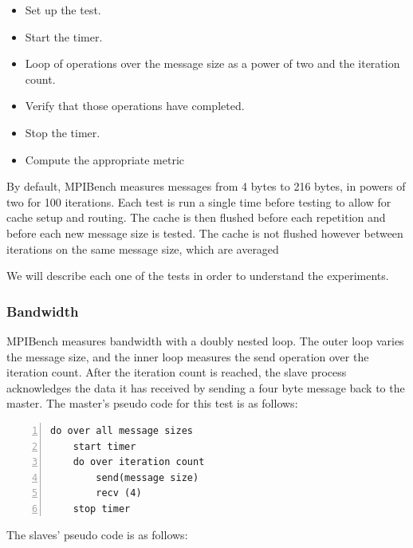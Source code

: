 \begin{itemize}
    \item Set up the test.
    \item Start the timer.
    \item Loop of operations over the message size as a power of two and the
iteration count.
    \item Verify that those operations have completed.
    \item Stop the timer.
    \item Compute the appropriate metric
\end{itemize}

By default, MPIBench measures messages from 4 bytes to 216 bytes, in powers of
two for 100 iterations. Each test is run a single time before testing to allow
for cache setup and routing. The cache is then flushed before each repetition
and before each new message size is tested. The cache is not flushed however
between iterations on the same message size, which are averaged

We will describe each one of the tests in order to understand the experiments.


\subsubsection{Bandwidth}

MPIBench measures bandwidth with a doubly nested loop. The outer loop varies the
message size, and the inner loop measures the send operation over the
iteration count. After the iteration count is reached, the slave process
acknowledges the data it has received by sending a four byte message back to
the master. The master's pseudo code for this test is as follows:

\begin{minipage}{\textwidth}
\end{minipage}

\begin{minipage}{\linewidth}
\begin{lstlisting}[frame=single,numbers=left]
do over all message sizes 
    start timer
    do over iteration count 
        send(message size) 
        recv (4)
    stop timer
\end{lstlisting}
\end{minipage}

The slaves' pseudo code is as follows:

\begin{minipage}{\textwidth}
\end{minipage}

